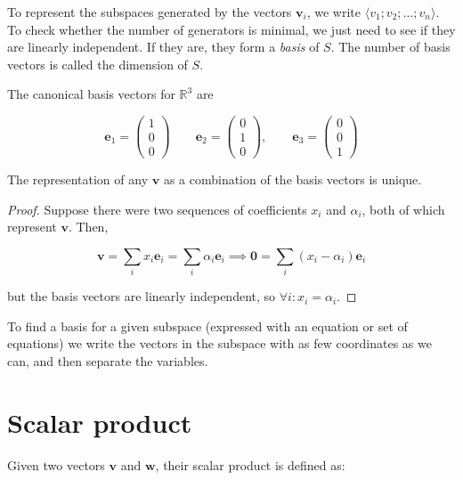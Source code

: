 \documentclass[12pt,a4paper]{report}
\numberwithin{equation}{section}
\theoremstyle{definition}
\theoremstyle{remark}
\begin{document}
To represent the subspaces generated by the vectors $\mathbf{v}_i$, we write $\langle v_1; v_2; \dots ; v_n\rangle$. To check whether the number of generators is minimal, we just need to see if they are linearly independent. If they are, they form a \emph{basis} of $S$. The number of basis vectors is called the dimension of $S$.

The canonical basis vectors for $\mathbb{R}^3$ are 

\begin{equation}
\mathbf{e}_1 = \begin{pmatrix}
1\\0\\0
\end{pmatrix} \qquad \mathbf{e}_2 = \begin{pmatrix}
0\\1\\0
\end{pmatrix},\qquad \mathbf{e}_3 = \begin{pmatrix}
0\\0\\1
\end{pmatrix}
\end{equation}

The representation of any $\mathbf{v}$ as a combination of the basis vectors is unique.

\begin{proof}
Suppose there were two sequences of coefficients $x_i$ and $\alpha_i$, both of which represent $\mathbf{v}$. Then,

\begin{equation}
\mathbf{v} = \sum_i x_i \mathbf{e}_i = \sum_i \alpha_i \mathbf{e}_i \implies \mathbf{0} = \sum_i (x_i - \alpha_i) \mathbf{e}_i
\end{equation}

but the basis vectors are linearly independent, so $\forall i: x_i = \alpha_i$.
\end{proof}

To find a basis for a given subspace (expressed with an equation or set of equations) we write the vectors in the subspace with as few coordinates as we can, and then separate the variables.

\section{Scalar product}

Given two vectors $\mathbf{v}$ and $\mathbf{w}$, their scalar product is defined as:
\end{document}
